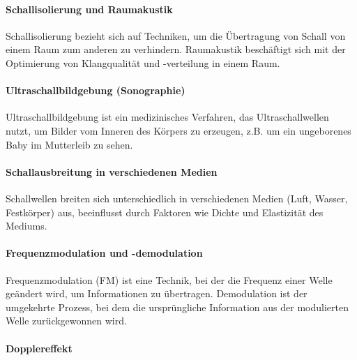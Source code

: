 \documentclass{vorlage-design-main}
\begin{document}
\hypertarget{schallisolierung-und-raumakustik}{%
\paragraph{Schallisolierung und
Raumakustik}\label{schallisolierung-und-raumakustik}}

Schallisolierung bezieht sich auf Techniken, um die Übertragung von
Schall von einem Raum zum anderen zu verhindern. Raumakustik beschäftigt
sich mit der Optimierung von Klangqualität und -verteilung in einem
Raum.

\hypertarget{ultraschallbildgebung-sonographie}{%
\paragraph{Ultraschallbildgebung
(Sonographie)}\label{ultraschallbildgebung-sonographie}}

Ultraschallbildgebung ist ein medizinisches Verfahren, das
Ultraschallwellen nutzt, um Bilder vom Inneren des Körpers zu erzeugen,
z.B. um ein ungeborenes Baby im Mutterleib zu sehen.

\hypertarget{schallausbreitung-in-verschiedenen-medien}{%
\paragraph{Schallausbreitung in verschiedenen
Medien}\label{schallausbreitung-in-verschiedenen-medien}}

Schallwellen breiten sich unterschiedlich in verschiedenen Medien (Luft,
Wasser, Festkörper) aus, beeinflusst durch Faktoren wie Dichte und
Elastizität des Mediums.

\hypertarget{frequenzmodulation-und--demodulation}{%
\paragraph{Frequenzmodulation und
-demodulation}\label{frequenzmodulation-und--demodulation}}

Frequenzmodulation (FM) ist eine Technik, bei der die Frequenz einer
Welle geändert wird, um Informationen zu übertragen. Demodulation ist
der umgekehrte Prozess, bei dem die ursprüngliche Information aus der
modulierten Welle zurückgewonnen wird.

\hypertarget{dopplereffekt}{%
\paragraph{Dopplereffekt}\label{dopplereffekt}}
\end{document}
